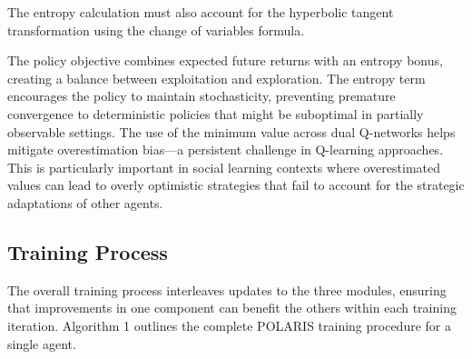 The entropy calculation must also account for the hyperbolic tangent transformation using the change of variables formula.

The policy objective combines expected future returns with an entropy bonus, creating a balance between exploitation and exploration. The entropy term encourages the policy to maintain stochasticity, preventing premature convergence to deterministic policies that might be suboptimal in partially observable settings. The use of the minimum value across dual Q-networks helps mitigate overestimation bias—a persistent challenge in Q-learning approaches. This is particularly important in social learning contexts where overestimated values can lead to overly optimistic strategies that fail to account for the strategic adaptations of other agents.


\subsection{Training Process}

The overall training process interleaves updates to the three modules, ensuring that improvements in one component can benefit the others within each training iteration. Algorithm 1 outlines the complete POLARIS training procedure for a single agent.

